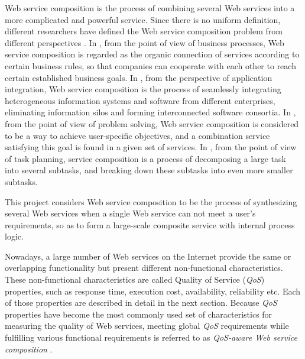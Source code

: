 Web service composition is the process of combining several Web services into a more complicated and powerful service. Since there is no uniform definition, different researchers have defined the Web service composition problem from different perspectives \cite{22,21,23,20}. In \cite{20}, from the point of view of business processes, Web service composition is regarded as the organic connection of services according to certain business rules, so that companies can cooperate with each other to reach certain established business goals. In \cite{21}, from the perspective of application integration, Web service composition is the process of seamlessly integrating heterogeneous information systems and software from different enterprises, eliminating information silos and forming interconnected software consortia. In \cite{22}, from the point of view of problem solving, Web service composition is considered to be a way to achieve user-specific objectives, and a combination service satisfying this goal is found in a given set of services. In \cite{23}, from the point of view of task planning, service composition is a process of decomposing a large task into several subtasks, and breaking down these subtasks into even more smaller subtasks.\par

This project considers Web service composition to be the process of synthesizing several Web services when a single Web service can not meet a user's requirements, so as to form a large-scale composite service with internal process logic.\par

Nowadays, a large number of Web services on the Internet provide the same or overlapping functionality but present different non-functional characteristics. These non-functional characteristics are called Quality of Service (\emph{QoS}) properties, such as response time, execution cost, availability, reliability etc. Each of those properties are described in detail in the next section. Because \emph{QoS} properties have become the most commonly used set of characteristics for measuring the quality of Web services, meeting global \emph{QoS} requirements while fulfilling various functional requirements is referred to as \emph{\emph{QoS}-aware Web service composition} \cite{26,28}.


